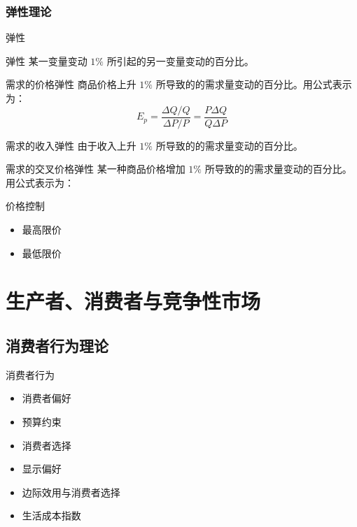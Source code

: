 \documentclass[UTF8]{ctexbeamer}
\begin{document}
\subsubsection{弹性理论}
\begin{frame}{弹性}
\begin{block}{弹性}
某一变量变动 $ 1\% $ 所引起的另一变量变动的百分比。
\end{block}
\begin{block}{需求的价格弹性}
商品价格上升 $ 1\% $ 所导致的的需求量变动的百分比。用公式表示为：
\begin{equation*}
E_p = \frac{\Delta Q / Q}{\Delta P / P} = \frac{P\Delta Q}{Q\Delta P}
\end{equation*}
\end{block}
\begin{block}{需求的收入弹性}
由于收入上升 $ 1\% $ 所导致的的需求量变动的百分比。
\end{block}
\begin{block}{需求的交叉价格弹性}
某一种商品价格增加 $ 1\% $ 所导致的的需求量变动的百分比。用公式表示为：
\end{block}
\end{frame}

\begin{frame}{价格控制}
\linespread{1.5}
\begin{itemize}
\item 最高限价
\item 最低限价
\end{itemize}
\end{frame}

\section{生产者、消费者与竞争性市场}

\subsection{消费者行为理论}
\begin{frame}{消费者行为}
\begin{itemize}
\item 消费者偏好
\item 预算约束
\item 消费者选择
\item 显示偏好
\item 边际效用与消费者选择
\item 生活成本指数
\end{itemize}
\end{frame}
\end{document}
